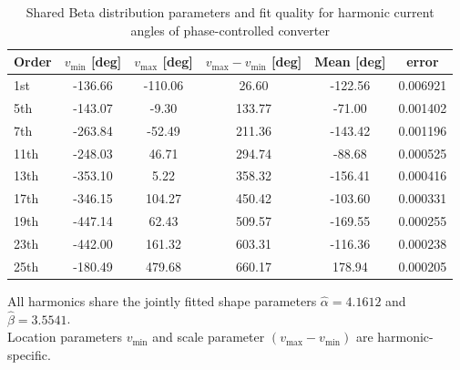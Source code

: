 \begin{table}[!t]
    \centering
    \caption{Shared Beta distribution parameters and fit quality for harmonic current angles of phase-controlled converter}
    \label{tab:beta_phase_params_pc_to25}
    \scriptsize
    \setlength{\tabcolsep}{3pt}
    \begin{tabular}{l c c c c c}
    Order & $v_{\min}$ [deg] & $v_{\max}$ [deg] & $v_{\max}-v_{\min}$ [deg] & Mean [deg] & error \\
    \hline
    1st & -136.66 & -110.06 & 26.60 & -122.56 & 0.006921 \\
    5th & -143.07 & -9.30 & 133.77 & -71.00 & 0.001402 \\
    7th & -263.84 & -52.49 & 211.36 & -143.42 & 0.001196 \\
    11th & -248.03 & 46.71 & 294.74 & -88.68 & 0.000525 \\
    13th & -353.10 & 5.22 & 358.32 & -156.41 & 0.000416 \\
    17th & -346.15 & 104.27 & 450.42 & -103.60 & 0.000331 \\
    19th & -447.14 & 62.43 & 509.57 & -169.55 & 0.000255 \\
    23th & -442.00 & 161.32 & 603.31 & -116.36 & 0.000238 \\
    25th & -180.49 & 479.68 & 660.17 & 178.94 & 0.000205 \\
    \end{tabular}
    \vspace{2pt}
    \parbox{\columnwidth}{\scriptsize All harmonics share the jointly fitted shape parameters $\hat{\alpha}=4.1612$ and $\hat{\beta}=3.5541$. \\
    Location parameters $v_{\min}$ and scale parameter $(v_{\max} - v_{\min})$ are harmonic-specific.}
\end{table}


